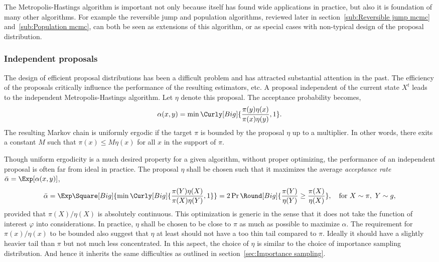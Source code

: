 The Metropolis-Hastings algorithm is important not only because itself has
found wide applications in practice, but also it is foundation of many other
algorithms. For example the reversible jump \mcmc and population \mcmc
algorithms, reviewed later in section~\ref{sub:Reversible jump mcmc}
and~\ref{sub:Population mcmc}, can both be seen as extensions of this
algorithm, or as special cases with non-typical design of the proposal
distribution.

\subsubsection{Independent proposals}
\label{ssub:Independent proposals}

The design of efficient proposal distributions has been a difficult problem
and has attracted substantial attention in the past. The efficiency of the
proposals critically influence the performance of the resulting estimators,
etc. A proposal independent of the current state $X^t$ leads to the
independent Metropolis-Hastings algorithm. Let $\eta$ denote this proposal.
The acceptance probability becomes,
\begin{equation}
  \alpha(x,y) = \min\Curly[Big]{\frac{\pi(y)\eta(x)}{\pi(x)\eta(y)},1}.
\end{equation}
The resulting Markov chain is uniformly ergodic if the target $\pi$ is bounded
by the proposal $\eta$ up to a multiplier. In other words, there exits a
constant $M$ such that $\pi(x)\le M\eta(x)$ for all $x$ in the support of
$\pi$.

Though uniform ergodicity is a much desired property for a given algorithm,
without proper optimizing, the performance of an independent proposal is often
far from ideal in practice. The proposal $\eta$ shall be chosen such that it
maximizes the average \emph{acceptance rate} $\bar\alpha = \Exp[\alpha(x,y)]$,
\begin{equation}
  \bar\alpha
  = \Exp\Square[Big]{\min\Curly[Big]{\frac{\pi(Y)\eta(X)}{\pi(X)\eta(Y)},1}}
  = 2\Pr\Round[Big]{\frac{\pi(Y)}{\eta(Y)}\ge\frac{\pi(X)}{\eta(X)}},\quad
  \text{for } X\sim\pi,\ Y\sim g,
\end{equation}
provided that $\pi(X)/\eta(X)$ is absolutely continuous. This optimization is
generic in the sense that it does not take the function of interest $\varphi$
into considerations. In practice, $\eta$ shall be chosen to be close to $\pi$
as much as possible to maximize $\alpha$. The requirement for $\pi(x)/\eta(x)$
to be bounded also suggest that $\eta$ at least should not have a too thin
tail compared to $\pi$. Ideally it should have a slightly heavier tail than
$\pi$ but not much less concentrated. In this aspect, the choice of $\eta$ is
similar to the choice of importance sampling distribution. And hence it
inherits the same difficulties as outlined in section~\ref{sec:Importance
  sampling}.

